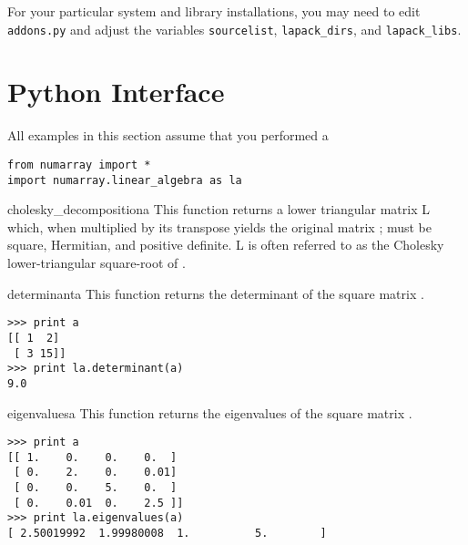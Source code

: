 For your particular system and library installations, you may need to edit
\texttt{addons.py} and adjust the variables \texttt{sourcelist},
\texttt{lapack_dirs}, and \texttt{lapack_libs}.



\section{Python Interface}
\label{sec:LA:python-interface}

All examples in this section assume that you performed a
\begin{verbatim}
from numarray import *
import numarray.linear_algebra as la
\end{verbatim}

\begin{funcdesc}{cholesky_decomposition}{a}
   This function returns a lower triangular matrix L which, when multiplied by
   its transpose yields the original matrix ;  must be 
   square, Hermitian, and positive definite. L is often referred to as the 
   Cholesky lower-triangular square-root of .
\end{funcdesc}
 
\begin{funcdesc}{determinant}{a}
   This function returns the determinant of the square matrix .
\begin{verbatim}
>>> print a
[[ 1  2]
 [ 3 15]]
>>> print la.determinant(a)
9.0
\end{verbatim}
\end{funcdesc}
 
\begin{funcdesc}{eigenvalues}{a}
   This function returns the eigenvalues of the square matrix .
\begin{verbatim}
>>> print a
[[ 1.    0.    0.    0.  ]
 [ 0.    2.    0.    0.01]
 [ 0.    0.    5.    0.  ]
 [ 0.    0.01  0.    2.5 ]]
>>> print la.eigenvalues(a)
[ 2.50019992  1.99980008  1.          5.        ]
\end{verbatim}
\end{funcdesc}
 
